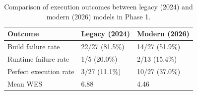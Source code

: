 \begin{table}[t]
\centering
\caption{Comparison of execution outcomes between legacy (2024) and modern (2026) models in Phase 1.}
\label{tab:phase1_generation_comparison}
\begin{tabular*}{\tblwidth}{@{} LLL@{} }
\toprule
Outcome & Legacy (2024) & Modern (2026) \\
\midrule
Build failure rate & 22/27 (81.5\%) & 14/27 (51.9\%) \\
Runtime failure rate & 1/5 (20.0\%) & 2/13 (15.4\%) \\
Perfect execution rate & 3/27 (11.1\%) & 10/27 (37.0\%) \\
Mean WES & 6.88 & 4.46 \\
\bottomrule
\end{tabular*}
\end{table}